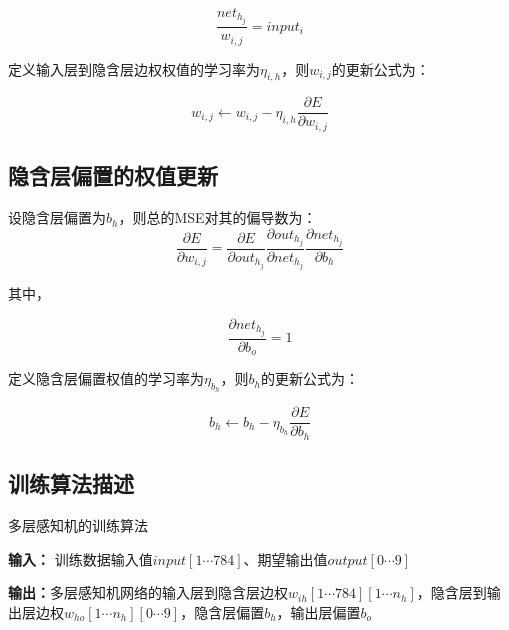 \documentclass[forprint]{WHUBachelor}
\begin{document}
         \begin{equation}
           \frac{net_{h_j}}{w_{i,j}}=
           input_i
           \label{equa34}
         \end{equation}
   
         定义输入层到隐含层边权权值的学习率为$\eta_{i,h}$，则$w_{i,j}$的更新公式为：
   
         \begin{equation}
           w_{i,j} \gets w_{i,j} - \eta_{i,h} \frac{\partial E} {\partial w_{i,j}}
         \end{equation}
         
       \subsection{隐含层偏置的权值更新}
       
         设隐含层偏置为$b_h$，则总的MSE对其的偏导数为：
         \begin{equation}
           \frac{\partial E}{\partial w_{i,j}}=
           \frac{\partial E}{\partial out_{h_j}}
           \frac{\partial out_{h_j}}{\partial net_{h_j}}
           \frac{\partial net_{h_j}}{\partial b_h}
         \end{equation}
         
         其中，
         
         \begin{equation}
           \frac{\partial net_{h_j}}{\partial b_o}=1
           \label{equa34}
         \end{equation}
         
         定义隐含层偏置权值的学习率为$\eta_{b_h}$，则$b_h$的更新公式为：
   
         \begin{equation}
           b_h\gets b_h-\eta_{b_h}\frac{\partial{E}}{\partial{b_h}}
         \end{equation}
         
       \subsection{训练算法描述}
       
       \begin{algorithm}
         \caption{多层感知机的训练算法}
         \textbf{输入：} 训练数据输入值$input[1\cdots 784]$、期望输出值$output[0\cdots 9]$
         
         \textbf{输出：}多层感知机网络的输入层到隐含层边权$w_{ih}[1\cdots 784][1\cdots n_h]$，隐含层到输出层边权$w_{ho}[1\cdots n_h][0\cdots 9]$，隐含层偏置$b_h$，输出层偏置$b_o$
         
         
       \end{algorithm}
       
\end{document}
